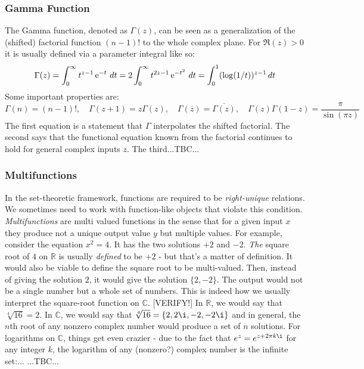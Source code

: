 \subsubsection{Gamma Function}
The Gamma function, denoted as $\Gamma(z)$, can be seen as a generalization of the (shifted) factorial function $(n-1)!$ to the whole complex plane. For $\Re(z)>0$ it is usually defined via a parameter integral like so:
\begin{equation}
\Gamma(z) =	\int_{0}^{\infty} t^{z-1} \operatorname{\mathrm{e}}^{-t} \, dt 
          = 2 \int_{0}^{\infty} t^{2z-1} \operatorname{\mathrm{e}}^{-t^2} \, dt 
          = \int_{0}^{1} (\log(1/t))^{z-1}  \, dt 	
\end{equation}
Some important properties are:
\begin{equation}
\Gamma(n) = (n-1)!, \quad	
\Gamma(z+1) = z \Gamma(z), \quad
\Gamma(\overline{z}) = \overline{\Gamma(z)}, \quad
\Gamma(z) \Gamma(1-z) = \frac{\pi}{\sin(\pi z)}
\end{equation}
The first equation is a statement that $\Gamma$ interpolates the shifted factorial. The second says that the functional equation known from the factorial continues to hold for general complex inputs $z$. The third...TBC...












\subsubsection{Multifunctions}
In the set-theoretic framework, functions are required to be \emph{right-unique} relations. We sometimes need to work with function-like objects that violate this condition. \emph{Multifunctions} are multi valued functions in the sense that for a given input $x$ they produce not a unique output value $y$ but multiple values. For example, consider the equation $x^2 = 4$. It has the two solutions $+2$ and $-2$. \emph{The} square root of $4$ on $\mathbb{R}$ is usually \emph{defined} to be $+2$ - but that's a matter of definition. It would also be viable to define the square root to be multi-valued. Then, instead of giving the solution $2$, it would give the solution $\{2,-2\}$. The output would not be a single number but a whole set of numbers. This is indeed how we usually interpret the square-root function on $\mathbb{C}$. [VERIFY!] In $\mathbb{R}$, we would say that $\sqrt[4]{16} = 2$. In $\mathbb{C}$, we would say that $\sqrt[4]{16} = \{2,2\i,-2,-2\i\}$ and in general, the $n$th root of any nonzero complex number would produce a set of $n$ solutions. For logarithms on $\mathbb{C}$, things get even crazier - due to the fact that $e^z = e^{z + 2 \pi k \i}$ for any integer $k$, the logarithm of any (nonzero?) complex number is the infinite set:...
...TBC...

